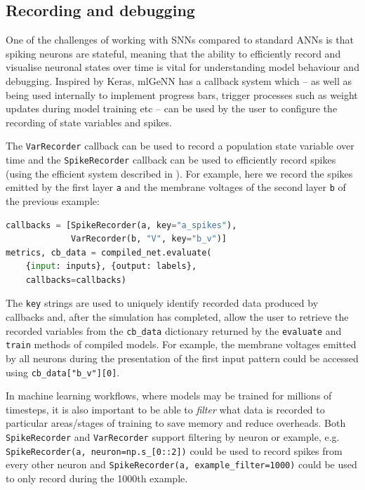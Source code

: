 \documentclass[sigconf]{acmart}
\begin{document}
\subsection{Recording and debugging}
One of the challenges of working with SNNs compared to standard ANNs is that spiking neurons are stateful, meaning that the ability to efficiently record and visualise neuronal states over time is vital for understanding model behaviour and debugging.
Inspired by Keras, mlGeNN has a callback system which -- as well as being used internally to implement progress bars, trigger processes such as weight updates during model training etc -- can be used by the user to configure the recording of state variables and spikes.

The \lstinline{VarRecorder} callback can be used to record a population state variable over time and the \lstinline{SpikeRecorder} callback can be used to efficiently record spikes (using the efficient system described in \citet{Knight2021}).
For example, here we record the spikes emitted by the first layer \lstinline{a} and the membrane voltages of the second  layer \lstinline{b} of the previous example:
\begin{lstlisting}[language=Python]
callbacks = [SpikeRecorder(a, key="a_spikes"),
             VarRecorder(b, "V", key="b_v")]
metrics, cb_data = compiled_net.evaluate(
    {input: inputs}, {output: labels},
    callbacks=callbacks)
\end{lstlisting}
The \lstinline{key} strings are used to uniquely identify recorded data produced by callbacks and, after the simulation has completed, allow the user to retrieve the recorded variables from the \lstinline{cb_data} dictionary returned by the \lstinline{evaluate} and \lstinline{train} methods of compiled models.
For example, the membrane voltages emitted by all neurons during the presentation of the first input pattern could be accessed using \lstinline{cb_data["b_v"][0]}.

In machine learning workflows, where models may be trained for millions of timesteps, it is also important to be able to \emph{filter} what data is recorded to particular areas/stages of training to save memory and reduce overheads.
Both \lstinline{SpikeRecorder} and \lstinline{VarRecorder} support filtering by neuron or example, e.g. \\ \lstinline{SpikeRecorder(a, neuron=np.s_[0::2])} could be used to record spikes from every other neuron and \lstinline{SpikeRecorder(a, example_filter=1000)} could be used to only record during the 1000th example.
\end{document}
